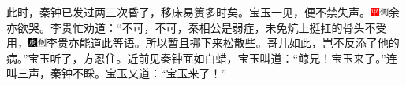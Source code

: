 {{{{{{{{{此时，秦钟已发过两三次昏了，移床易箦多时矣。宝玉一见，便不禁失声。{\includegraphics[width=3mm]{../Images/00002}\includegraphics[width=3mm]{../Images/00011}\footnotesize \kaishu 余亦欲哭。}李贵忙劝道：“不可，不可，秦相公是弱症，未免炕上挺扛的骨头不受用，{\includegraphics[width=3mm]{../Images/00004}\includegraphics[width=3mm]{../Images/00011}\footnotesize \kaishu 李贵亦能道此等语。}所以暂且挪下来松散些。哥儿如此，岂不反添了他的病。”宝玉听了，方忍住。近前见秦钟面如白蜡，宝玉叫道：“鲸兄！宝玉来了。”连叫三声，秦钟不睬。宝玉又道：“宝玉来了！”

}}}}}}}}}
